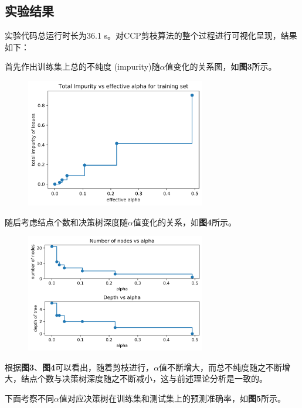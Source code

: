 \documentclass[12pt]{article}
\begin{document}
\subsection{实验结果}
实验代码总运行时长为36.1 s。对CCP剪枝算法的整个过程进行可视化呈现，结果如下：\par 
首先作出训练集上总的不纯度 (impurity)随$\alpha$值变化的关系图，如\textbf{图3}所示。
\begin{figure}[h]
	\centering
	\includegraphics[width=0.7\textwidth]{1.png}
\end{figure}
\par 
随后考虑结点个数和决策树深度随$\alpha$值变化的关系，如\textbf{图4}所示。
\begin{figure}[h]
	\centering
	\includegraphics[width=0.7\textwidth]{2.png}
\end{figure}
\par
根据\textbf{图3}、\textbf{图4}可以看出，随着剪枝进行，$\alpha$值不断增大，而总不纯度随之不断增大，结点个数与决策树深度随之不断减小，这与前述理论分析是一致的。\par 
下面考察不同$\alpha$值对应决策树在训练集和测试集上的预测准确率，如\textbf{图5}所示。\par 
\end{document}
